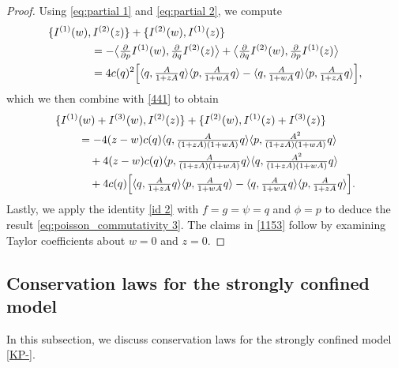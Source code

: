 \documentclass{amsart}
\theoremstyle{definition}
\numberwithin{equation}{section}
\newcommand{\la}{\langle}
\newcommand{\ra}{\rangle}
\begin{document}
\begin{proof}
Using \eqref{eq:partial 1} and \eqref{eq:partial 2}, we compute
\begin{align}\label{440}
\{I^{(1)}(w),&\, I ^{(2)}(z) \}+ \{I^{(2)}(w),I ^{(1)}(z) \} \notag\\
&= -\bigl\langle \tfrac{\partial}{\partial p} I^{(1)}(w),\tfrac{\partial}{\partial q} I^{(2)}(z) \bigr\rangle
	+ \bigl\langle \tfrac{\partial}{\partial q} I^{(2)}(w),\tfrac{\partial}{\partial p} I^{(1)}(z) \bigr\rangle\\
&=4c(q)^2 \Bigl[ \la q,\tfrac{A}{1+zA}q\ra \la p, \tfrac{A}{1+wA}q\ra  -  \la q, \tfrac{A}{1+wA}q\ra \la p,\tfrac{A}{1+zA}q\ra \Bigr], \notag
\end{align}
which we then combine with \eqref{441} to obtain
\begin{align*}
\{I^{(1)}&(w)+I^{(3)}(w),I ^{(2)}(z) \} +	\{I^{(2)}(w),I ^{(1)}(z)+I ^{(3)}(z) \} \\
&=-4(z-w)c(q)\la q, \tfrac{A}{(1+z A)(1+wA)}q\ra \la p, \tfrac{A^2}{(1+z A)(1+wA)} q\ra\\
&\quad+4(z-w)c(q)\la p, \tfrac{A}{(1+z A)(1+wA)}q\ra \la q, \tfrac{A^2}{(1+z A)(1+wA)} q\ra\notag\\
&\quad + 4c(q) \Bigl[ \la q, \tfrac{A}{1+zA}q\ra \la p, \tfrac{A}{1+wA}q\ra - 
	\la q, \tfrac{A}{1+wA}q\ra \la p, \tfrac{A}{1+zA}q\ra  \Bigr]. \notag
\end{align*}
Lastly, we apply the identity \eqref{id 2} with $f=g=\psi= q$ and $\phi=p$ to deduce the result \eqref{eq:poisson_commutativity 3}.  The claims in \eqref{1153} follow by examining Taylor coefficients about $w=0$ and $z=0$.
\end{proof}


\subsection{Conservation laws for the strongly confined model}\label{SS:3.1}

In this subsection, we discuss conservation laws for the strongly confined model \eqref{KP-}. 
\end{document}
